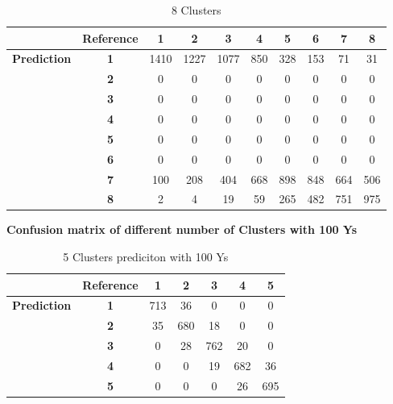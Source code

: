 \documentclass{article}
\begin{document}
\begin{table}[ht]
  \vspace{1em} %

  \begin{minipage}{0.8\textwidth}
    \centering
    \begin{tabular}{c|c|c|c|c|c|c|c|c|c}
      & \textbf{Reference} & \textbf{1} & \textbf{2} & \textbf{3} & \textbf{4} & \textbf{5} & \textbf{6} & \textbf{7} & \textbf{8} \\
      \hline
      \textbf{Prediction} & \textbf{1} & 1410 & 1227 & 1077 & 850 & 328 & 153 & 71 & 31 \\
                          & \textbf{2} & 0 & 0 & 0 & 0 & 0 & 0 & 0 & 0 \\
                          & \textbf{3} & 0 & 0 & 0 & 0 & 0 & 0 & 0 & 0 \\
                          & \textbf{4} & 0 & 0 & 0 & 0 & 0 & 0 & 0 & 0 \\
                          & \textbf{5} & 0 & 0 & 0 & 0 & 0 & 0 & 0 & 0 \\
                          & \textbf{6} & 0 & 0 & 0 & 0 & 0 & 0 & 0 & 0 \\
                          & \textbf{7} & 100 & 208 & 404 & 668 & 898 & 848 & 664 & 506 \\
                          & \textbf{8} & 2 & 4 & 19 & 59 & 265 & 482 & 751 & 975 \\
    \end{tabular}
    \caption{8 Clusters}
    \label{tab:8_clu}
  \end{minipage}

\end{table}

\begin{table}[ht]
  \centering

  \caption*{\textbf{Confusion matrix of different number of Clusters with 100 Ys}}

  \begin{minipage}{0.6\textwidth}
    \centering
    \begin{tabular}{c|c|c|c|c|c|c}
      & \textbf{Reference} & \textbf{1} & \textbf{2} & \textbf{3} & \textbf{4} & \textbf{5} \\
      \hline
      \textbf{Prediction} & \textbf{1} & 713 & 36 & 0 & 0 & 0 \\
                          & \textbf{2} & 35 & 680 & 18 & 0 & 0 \\
                          & \textbf{3} & 0 & 28 & 762 & 20 & 0 \\
                          & \textbf{4} & 0 & 0 & 19 & 682 & 36 \\
                          & \textbf{5} & 0 & 0 & 0 & 26 & 695 \\
    \end{tabular}
    \caption{5 Clusters prediciton with 100 Ys}
    \label{tab:5_clu_100_ys}
  \end{minipage}  

\end{table}
\end{document}
